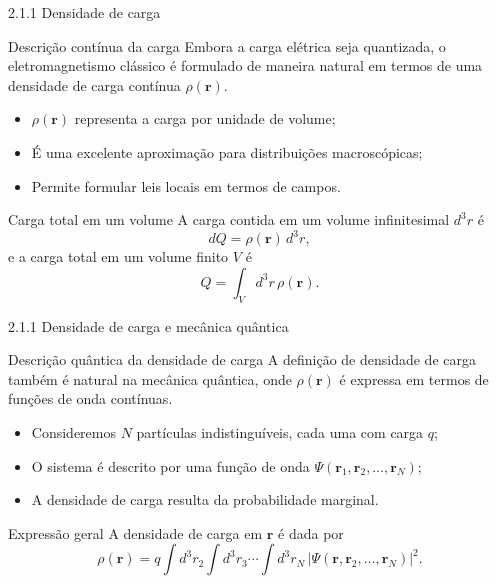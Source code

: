 \documentclass[aspectratio=169]{beamer}
\newcommand{\blue}[1]{\textcolor{myblue}{#1}}
\newcommand{\red}[1]{\textcolor{myred}{#1}}
\begin{document}
\begin{frame}{2.1.1 Densidade de carga}
\begin{block}{Descrição contínua da carga}
Embora a carga elétrica seja \blue{quantizada}, o eletromagnetismo clássico
é formulado de maneira natural em termos de uma \red{densidade de carga}
contínua $\rho(\bm r)$.
\end{block}

\begin{itemize}
  \item $\rho(\bm r)$ representa a carga por unidade de volume;
  \item É uma excelente aproximação para distribuições macroscópicas;
  \item Permite formular leis locais em termos de campos.
\end{itemize}
\end{frame}

\begin{frame}
\begin{block}{Carga total em um volume}
A carga contida em um volume infinitesimal $d^3 r$ é
\begin{equation}
dQ = \rho(\bm r)\, d^3 r,
\label{eq:dQ}
\end{equation}
e a carga total em um volume finito $V$ é
\begin{equation}
Q = \int_V d^3 r\, \rho(\bm r).
\tag{2.3}
\label{eq:Q_rho}
\end{equation}
\end{block}
\end{frame}

\begin{frame}{2.1.1 Densidade de carga e mecânica quântica}
\begin{block}{Descrição quântica da densidade de carga}
A definição de densidade de carga também é natural na \blue{mecânica quântica},
onde $\rho(\bm r)$ é expressa em termos de \red{funções de onda contínuas}.
\end{block}

\begin{itemize}
  \item Consideremos $N$ partículas indistinguíveis, cada uma com carga $q$;
  \item O sistema é descrito por uma função de onda $\Psi(\bm r_1,\bm r_2,\ldots,\bm r_N)$;
  \item A densidade de carga resulta da probabilidade marginal.
\end{itemize}

\begin{block}{Expressão geral}
A densidade de carga em $\bm r$ é dada por
\begin{equation}
\rho(\bm r)
=
q \int d^3 r_2
\int d^3 r_3 \cdots
\int d^3 r_N\,
\left|\Psi(\bm r,\bm r_2,\ldots,\bm r_N)\right|^2.
\tag{2.4}
\label{eq:rho_QM}
\end{equation}
\end{block}

\end{frame}
\end{document}
